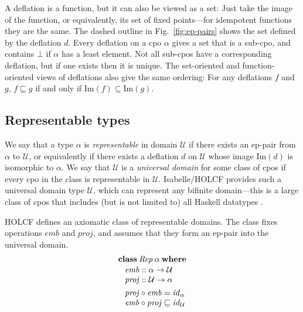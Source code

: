 \documentclass{sigplanconf}
\newcommand{\U}{\ensuremath{\mathcal{U}}}
\newcommand{\below}{\sqsubseteq}
\newcommand{\kwd}[1]{\mathbf{#1}}
\newcommand{\hsc}[1]{\ensuremath{\mathit{#1}}}
\newcommand{\hsid}{\hsc{id}}
\newcommand{\hsemb}{\hsc{emb}}
\newcommand{\hsproj}{\hsc{proj}}
\newcommand{\tA}{\alpha}
\theoremstyle{definition}
\begin{document}
A deflation is a function, but it can also be viewed as a set: Just take the image of the function, or equivalently, its set of fixed points---for idempotent functions they are the same. The dashed outline in Fig.~\ref{fig:ep-pairs} shows the set defined by the deflation $d$. Every deflation on a cpo $\tA$ gives a set that is a sub-cpo, and contains $\bot$ if $\tA$ has a least element. Not all sub-cpos have a corresponding deflation, but if one exists then it is unique. The set-oriented and function-oriented views of deflations also give the same ordering: For any deflations $f$ and $g$, $f \sqsubseteq g$ if and only if $\mathrm{Im}(f) \subseteq \mathrm{Im}(g)$.

\subsection{Representable types}
\label{sec:universal-deflation}

We say that a type $\tA$ is \emph{representable} in domain $\U$ if there exists an ep-pair from $\tA$ to $\U$, or equivalently if there exists a deflation $d$ on $\U$ whose image $\mathrm{Im}(d)$ is isomorphic to $\tA$. We say that $\U$ is a \emph{universal domain} for some class of cpos if every cpo in the class is representable in $\U$. Isabelle/HOLCF provides such a universal domain type $\U$, which can represent any bifinite domain---this is a large class of cpos that includes (but is not limited to) all Haskell datatypes \cite{Huffman2009}.

HOLCF defines an axiomatic class of representable domains. The class fixes operations $\hsemb$ and $\hsproj$, and assumes that they form an ep-pair into the universal domain.
%
\begin{align*}
  & \kwd{class}\:\hsc{Rep}\:\tA\:\kwd{where} \\[-\jot]
  & \hspace{8pt}
  \begin{alignedat}{2}
    & \hsemb &&:: \tA \to \U \\[-\jot]
    & \hsproj &&:: \U \to \tA
  \end{alignedat} \\
  & \hspace{8pt}
  \begin{alignedat}{2}
    & \hsproj \circ \hsemb = \hsid_\tA \\[-\jot]
    & \hsemb \circ \hsproj \below \hsid_\U
  \end{alignedat}
\end{align*}
\end{document}
